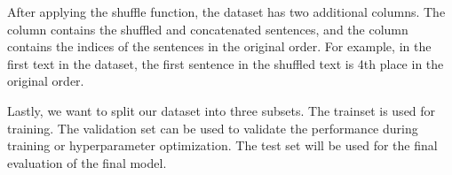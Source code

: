 \documentclass[letterpaper,10pt,english]{jupyterBook}
\begin{document}
\sphinxAtStartPar
After applying the shuffle function, the dataset has two additional columns. The  column contains the shuffled and concatenated sentences, and the  column contains the indices of the sentences in the original order. For example, in the first text in the dataset, the first sentence in the shuffled text is 4th place in the original order.
\begin{sphinxVerbatimInput}

\begin{sphinxVerbatim}[commandchars=\\\{\}]
\PYG{p}{[}\PYG{p}{]}
\end{sphinxVerbatim}
\end{sphinxVerbatimInput}

\sphinxAtStartPar
Lastly, we want to split our dataset into three subsets.
The train\sphinxhyphen{}set is used for training.
The validation set can be used to validate the performance during training or hyperparameter optimization.
The test set will be used for the final evaluation of the final model.
\begin{sphinxVerbatimInput}

\begin{sphinxVerbatim}[commandchars=\\\{\}]
   

  \PYG{p}{[}\PYG{p}{]} 

  
     \PYG{p}{[}\PYG{p}{]}
     \PYG{p}{[}\PYG{p}{]}
     \PYG{p}{[}\PYG{p}{]}
\end{sphinxVerbatim}
\end{sphinxVerbatimInput}
\end{document}
